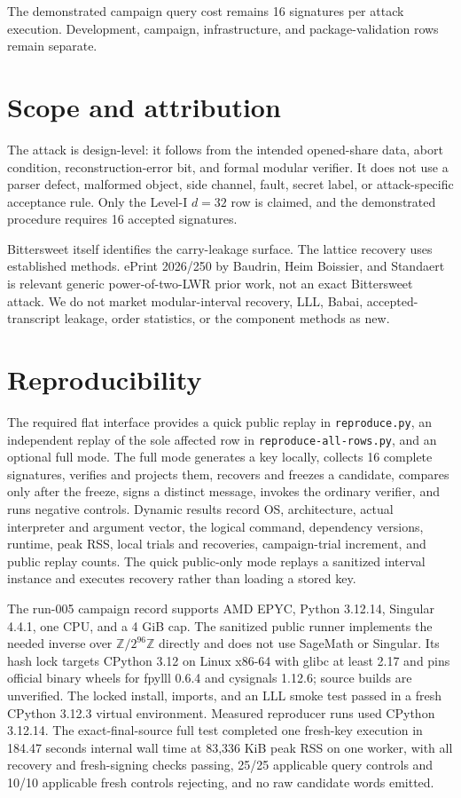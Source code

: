 \documentclass[10pt,a4paper]{article}
\newcommand{\Z}{\mathbb{Z}}
\begin{document}
The demonstrated campaign query cost remains 16 signatures per attack
execution.  Development, campaign, infrastructure, and package-validation
rows remain separate.

\section{Scope and attribution}

The attack is design-level: it follows from the intended opened-share data,
abort condition, reconstruction-error bit, and formal modular verifier.  It
does not use a parser defect, malformed object, side channel, fault, secret
label, or attack-specific acceptance rule.  Only the Level-I $d=32$ row is
claimed, and the demonstrated procedure requires 16 accepted signatures.

Bittersweet itself identifies the carry-leakage surface.  The lattice recovery
uses established methods.  ePrint 2026/250 by Baudrin, Heim Boissier, and
Standaert is relevant generic power-of-two-LWR prior work, not an exact
Bittersweet attack.  We do not market modular-interval recovery, LLL, Babai,
accepted-transcript leakage, order statistics, or the component methods as
new.

\section{Reproducibility}

The required flat interface provides a quick public replay in
\texttt{reproduce.py}, an independent replay of the sole affected row in
\texttt{reproduce-all-rows.py}, and an optional full mode.  The full mode
generates a key locally, collects 16 complete
signatures, verifies and projects them, recovers and freezes a candidate,
compares only after the freeze, signs a distinct message, invokes the ordinary
verifier, and runs negative controls.  Dynamic results record OS, architecture,
actual interpreter and argument vector, the logical command, dependency
versions, runtime, peak RSS, local trials and recoveries, campaign-trial
increment, and public replay counts.  The quick public-only mode
replays a sanitized interval instance and executes recovery rather than loading
a stored key.

The run-005 campaign record supports AMD EPYC, Python 3.12.14, Singular 4.4.1,
one CPU, and a 4 GiB cap.  The sanitized public runner implements the needed
inverse over $\Z/2^{96}\Z$ directly and does not use SageMath or Singular.  Its
hash lock targets CPython 3.12 on Linux x86-64 with glibc at least 2.17 and
pins official binary wheels for fpylll 0.6.4 and cysignals 1.12.6; source
builds are unverified.  The locked install, imports, and an LLL smoke test
passed in a fresh CPython 3.12.3 virtual environment.  Measured reproducer runs
used CPython 3.12.14.
The exact-final-source full test completed one fresh-key execution in 184.47
seconds internal wall time at 83,336 KiB peak RSS on one worker, with all
recovery and fresh-signing checks passing, 25/25 applicable query controls and
10/10 applicable fresh controls rejecting, and no raw candidate words emitted.
\end{document}
